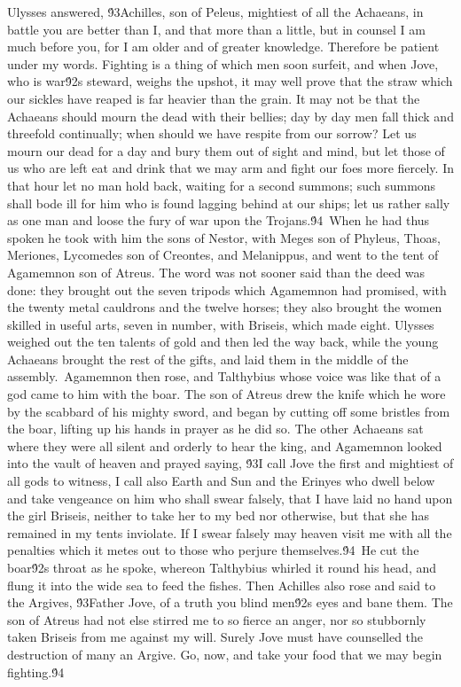 {Ulysses answered, \'93Achilles, son of Peleus, mightiest of all the Achaeans, in battle you are better than I, and that more than a little, but in counsel I am much before you, for I am older and of greater knowledge. Therefore be patient under my words. Fighting is a thing of which men soon surfeit, and when Jove, who is war\'92s steward, weighs the upshot, it may well prove that the straw which our sickles have reaped is far heavier than the grain. It may not be that the Achaeans should mourn the dead with their bellies; day by day men fall thick and threefold continually; when should we have respite from our sorrow? Let us mourn our dead for a day and bury them out of sight and mind, but let those of us who are left eat and drink that we may arm and fight our foes more fiercely. In that hour let no man hold back, waiting for a second summons; such summons shall bode ill for him who is found lagging behind at our ships; let us rather sally as one man and loose the fury of war upon the Trojans.\'94\
When he had thus spoken he took with him the sons of Nestor, with Meges son of Phyleus, Thoas, Meriones, Lycomedes son of Creontes, and Melanippus, and went to the tent of Agamemnon son of Atreus. The word was not sooner said than the deed was done: they brought out the seven tripods which Agamemnon had promised, with the twenty metal cauldrons and the twelve horses; they also brought the women skilled in useful arts, seven in number, with Briseis, which made eight. Ulysses weighed out the ten talents of gold and then led the way back, while the young Achaeans brought the rest of the gifts, and laid them in the middle of the assembly.\
Agamemnon then rose, and Talthybius whose voice was like that of a god came to him with the boar. The son of Atreus drew the knife which he wore by the scabbard of his mighty sword, and began by cutting off some bristles from the boar, lifting up his hands in prayer as he did so. The other Achaeans sat where they were all silent and orderly to hear the king, and Agamemnon looked into the vault of heaven and prayed saying, \'93I call Jove the first and mightiest of all gods to witness, I call also Earth and Sun and the Erinyes who dwell below and take vengeance on him who shall swear falsely, that I have laid no hand upon the girl Briseis, neither to take her to my bed nor otherwise, but that she has remained in my tents inviolate. If I swear falsely may heaven visit me with all the penalties which it metes out to those who perjure themselves.\'94\
He cut the boar\'92s throat as he spoke, whereon Talthybius whirled it round his head, and flung it into the wide sea to feed the fishes. Then Achilles also rose and said to the Argives, \'93Father Jove, of a truth you blind men\'92s eyes and bane them. The son of Atreus had not else stirred me to so fierce an anger, nor so stubbornly taken Briseis from me against my will. Surely Jove must have counselled the destruction of many an Argive. Go, now, and take your food that we may begin fighting.\'94\
}
